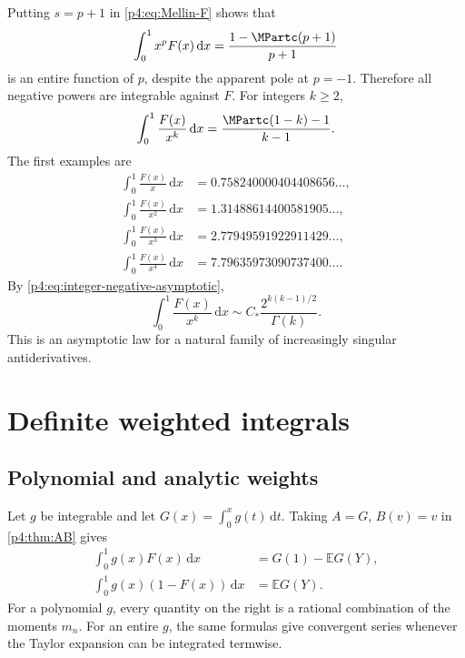 \documentclass[11pt,oneside]{article}
\theoremstyle{definition}
\theoremstyle{remark}
\newcommand{\F}{F}
\newcommand{\E}{\mathbb E}
\newcommand{\dd}{\,\mathrm d}
\newcommand{\1}{\mathbf 1}
\begin{document}
Putting \(s=p+1\) in \cref{p4:eq:Mellin-F} shows that
\begin{equation}\label{p4:eq:weighted-F-complete}
 \int_0^1x^p\F(x)\dd x
 =\frac{1-\MPartc(p+1)}{p+1}
\end{equation}
is an entire function of \(p\), despite the apparent pole at \(p=-1\).  Therefore
all negative powers are integrable against \(\F\).  For integers \(k\ge2\),
\begin{equation}\label{p4:eq:singular-F-integers}
 \int_0^1\frac{\F(x)}{x^k}\dd x
 =\frac{\MPartc(1-k)-1}{k-1}.
\end{equation}
The first examples are
\begin{align}
 \int_0^1\frac{\F(x)}{x}\dd x
 &=0.758240000404408656\ldots,\nonumber\\
 \int_0^1\frac{\F(x)}{x^2}\dd x
 &=1.31488614400581905\ldots,\nonumber\\
 \int_0^1\frac{\F(x)}{x^3}\dd x
 &=2.77949591922911429\ldots,\nonumber\\
 \int_0^1\frac{\F(x)}{x^4}\dd x
 &=7.79635973090737400\ldots.\label{p4:eq:singular-F-values}
\end{align}
By \cref{p4:eq:integer-negative-asymptotic},
\begin{equation}\label{p4:eq:singular-F-asymptotic}
 \int_0^1\frac{\F(x)}{x^k}\dd x
 \sim C_*\frac{2^{k(k-1)/2}}{\Gamma(k)}.
\end{equation}
This is an asymptotic law for a natural family of increasingly singular antiderivatives.

\section{Definite weighted integrals}

\subsection{Polynomial and analytic weights}

Let \(g\) be integrable and let \(G(x)=\int_0^xg(t)\dd t\).  Taking \(A=G\),
\(B(v)=v\) in \cref{p4:thm:AB} gives
\begin{align}
 \int_0^1g(x)\F(x)\dd x&=G(1)-\E G(Y),
 \label{p4:eq:analytic-kernel-F}\\
 \int_0^1g(x)(1-\F(x))\dd x&=\E G(Y).
 \label{p4:eq:analytic-kernel-up}
\end{align}
For a polynomial \(g\), every quantity on the right is a rational combination of the
moments \(m_n\).  For an entire \(g\), the same formulas give convergent series whenever
the Taylor expansion can be integrated termwise.
\end{document}
